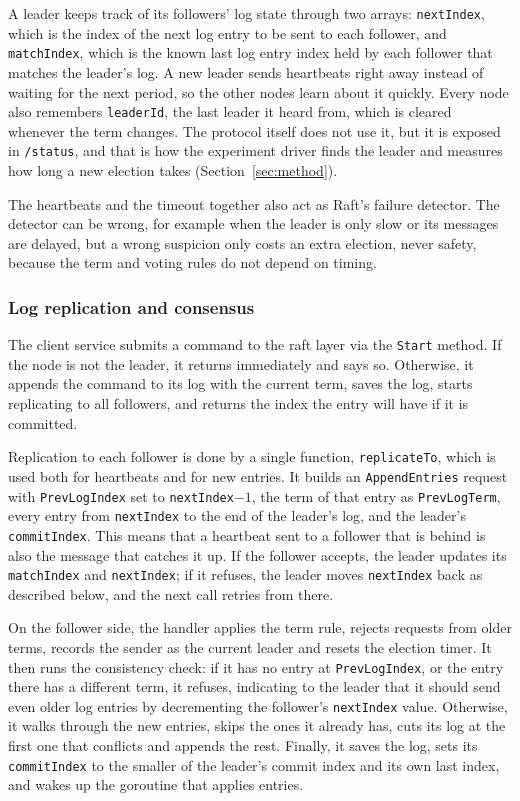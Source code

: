\documentclass[conference]{IEEEtran}
\begin{document}
A leader keeps track of its followers' log state through two arrays: \texttt{nextIndex}, which is the index of the next log entry to be sent to each follower, and \texttt{matchIndex}, which is the known last log entry index held by each follower that matches the leader's log. A new leader sends heartbeats right away instead of waiting for the next period, so the other nodes learn about it quickly. Every node also remembers \texttt{leaderId}, the last leader it heard from, which is cleared whenever the term changes. The protocol itself does not use it, but it is exposed in \texttt{/status}, and that is how the experiment driver finds the leader and measures how long a new election takes (Section~\ref{sec:method}).

The heartbeats and the timeout together also act as Raft's failure detector. The detector can be wrong, for example when the leader is only slow or its messages are delayed, but a wrong suspicion only costs an extra election, never safety, because the term and voting rules do not depend on timing.

\subsubsection{\textbf{Log replication and consensus}}
\label{sec:algs-replication}
The client service submits a command to the raft layer via the \texttt{Start} method. If the node is not the leader, it returns immediately and says so. Otherwise, it appends the command to its log with the current term, saves the log, starts replicating to all followers, and returns the index the entry will have if it is committed.

Replication to each follower is done by a single function, \texttt{replicateTo}, which is used both for heartbeats and for new entries. It builds an \texttt{AppendEntries} request with \texttt{PrevLogIndex} set to \texttt{nextIndex}$-1$, the term of that entry as \texttt{PrevLogTerm}, every entry from \texttt{nextIndex} to the end of the leader's log, and the leader's \texttt{commitIndex}. This means that a heartbeat sent to a follower that is behind is also the message that catches it up. If the follower accepts, the leader updates its \texttt{matchIndex} and \texttt{nextIndex}; if it refuses, the leader moves \texttt{nextIndex} back as described below, and the next call retries from there.

On the follower side, the handler applies the term rule, rejects requests from older terms, records the sender as the current leader and resets the election timer. It then runs the consistency check: if it has no entry at \texttt{PrevLogIndex}, or the entry there has a different term, it refuses, indicating to the leader that it should send even older log entries by decrementing the follower's \texttt{nextIndex} value. Otherwise, it walks through the new entries, skips the ones it already has, cuts its log at the first one that conflicts and appends the rest. Finally, it saves the log, sets its \texttt{commitIndex} to the smaller of the leader's commit index and its own last index, and wakes up the goroutine that applies entries.
\end{document}
